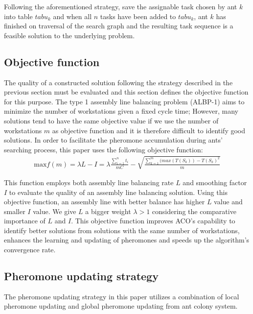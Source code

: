 Following the aforementioned strategy, save the assignable task chosen by ant $k$ into table $tabu_k$ and when all $n$ tasks have been added to $tabu_k$, ant $k$ has finished on traversal of the search graph and the resulting task sequence is a feasible solution to the underlying problem.

\subsection{Objective function}
The quality of a constructed solution following the strategy described in the previous section must be evaluated and this section defines the objective function for this purpose.
The type 1 assembly line balancing problem (ALBP-1) aims to minimize the number of workstations given a fixed cycle time; However, many solutions tend to have the same objective value if we use the number of workstations $m$ as objective function and it is therefore difficult to identify good solutions.
In order to facilitate the pheromone accumulation during ants' searching process, this paper uses the following objective function:
\begin{align}
	\text{max} f(m) = \lambda L - I 
	= \lambda \frac{\sum_{i = 1}^{n} t_i}{mC} - \sqrt{\frac{\sum_{k=1}^m (max(T(S_k)) - T(S_k)^2}{m}} \label{formula8}
\end{align}

This function employs both assembly line balancing rate $L$ and smoothing factor $I$ to evaluate the quality of an assembly line balancing solution.
Using this objective function, an assembly line with better balance has higher $L$ value and smaller $I$ value.
We give $L$ a bigger weight $\lambda > 1$ considering the comparative importance of $L$ and $I$. 
This objective function improves ACO's capability to identify better solutions from solutions with the same number of workstations, enhances the learning and updating of pheromones and speeds up the algorithm's convergence rate. 




\subsection{Pheromone updating strategy}
The pheromone updating strategy in this paper utilizes a combination of local pheromone updating and global pheromone updating from ant colony system.

